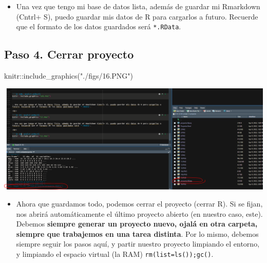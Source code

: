 \documentclass[
]{article}
\newenvironment{Shaded}{}{}
\newcommand{\FunctionTok}[1]{\textcolor[rgb]{0.02,0.16,0.49}{#1}}
\newcommand{\NormalTok}[1]{#1}
\newcommand{\SpecialCharTok}[1]{\textcolor[rgb]{0.25,0.44,0.63}{#1}}
\newcommand{\StringTok}[1]{\textcolor[rgb]{0.25,0.44,0.63}{#1}}
\providecommand{\tightlist}{%
  \setlength{\itemsep}{0pt}\setlength{\parskip}{0pt}}
\begin{document}
\begin{itemize}
\tightlist
\item
  Una vez que tengo mi base de datos lista, además de guardar mi
  Rmarkdown (Cntrl+ S), puedo guardar mis datos de R para cargarlos a
  futuro. Recuerde que el formato de los datos guardados será
  \texttt{*.RData}.
\end{itemize}

\hypertarget{paso-4.-cerrar-proyecto}{%
\subsection{Paso 4. Cerrar proyecto}\label{paso-4.-cerrar-proyecto}}

\begin{Shaded}
\begin{Highlighting}[]
\NormalTok{knitr}\SpecialCharTok{::}\FunctionTok{include\_graphics}\NormalTok{(}\StringTok{"./figs/16.PNG"}\NormalTok{)}
\end{Highlighting}
\end{Shaded}

\begin{center}\includegraphics[width=0.6\linewidth]{./figs/16} \end{center}

\begin{itemize}
\tightlist
\item
  Ahora que guardamos todo, podemos cerrar el proyecto (cerrar R). Si se
  fijan, nos abrirá automáticamente el último proyecto abierto (en
  nuestro caso, este). Debemos \textbf{siempre generar un proyecto
  nuevo, ojalá en otra carpeta, siempre que trabajemos en una tarea
  distinta}. Por lo mismo, debemos siempre seguir los pasos aquí, y
  partir nuestro proyecto limpiando el entorno, y limpiando el espacio
  virtual (la RAM) \texttt{rm(list=ls());gc()}.
\end{itemize}
\end{document}
